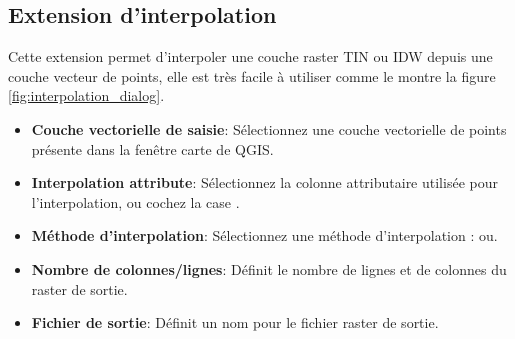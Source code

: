 
%
%

\subsection{Extension d'interpolation}

Cette extension permet d'interpoler une couche raster TIN ou IDW depuis une couche vecteur de points, elle est très facile à utiliser comme le montre la figure \ref{fig:interpolation_dialog}.


\begin{itemize}
\item \textbf{Couche vectorielle de saisie}: Sélectionnez une couche vectorielle de points présente dans la fenêtre carte de QGIS.
\item \textbf{Interpolation attribute}: Sélectionnez la colonne attributaire utilisée pour l'interpolation, ou 
cochez la case .
\item \textbf{Méthode d'interpolation}: Sélectionnez une méthode d'interpolation :  ou.
\item \textbf{Nombre de colonnes/lignes}: Définit le nombre de lignes et de colonnes du raster de sortie.
\item \textbf{Fichier de sortie}: Définit un nom pour le fichier raster de sortie.
\end{itemize}

